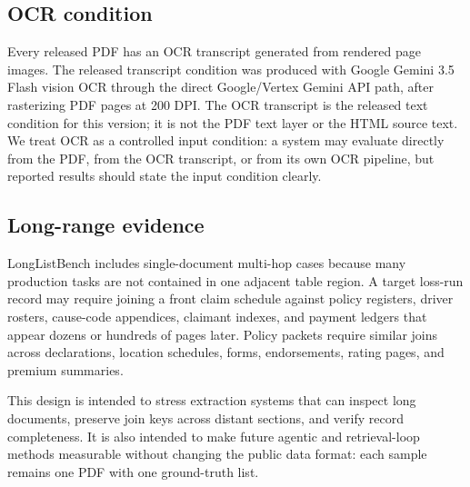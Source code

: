 \subsection{OCR condition}
\label{subsec:ocr-condition}
Every released PDF has an OCR transcript generated from rendered page images. The released transcript condition was produced with Google Gemini 3.5 Flash vision OCR through the direct Google/Vertex Gemini API path, after rasterizing PDF pages at 200 DPI. The OCR transcript is the released text condition for this version; it is not the PDF text layer or the HTML source text. We treat OCR as a controlled input condition: a system may evaluate directly from the PDF, from the OCR transcript, or from its own OCR pipeline, but reported results should state the input condition clearly.

\subsection{Long-range evidence}
LongListBench includes single-document multi-hop cases because many production tasks are not contained in one adjacent table region. A target loss-run record may require joining a front claim schedule against policy registers, driver rosters, cause-code appendices, claimant indexes, and payment ledgers that appear dozens or hundreds of pages later. Policy packets require similar joins across declarations, location schedules, forms, endorsements, rating pages, and premium summaries.

This design is intended to stress extraction systems that can inspect long documents, preserve join keys across distant sections, and verify record completeness. It is also intended to make future agentic and retrieval-loop methods measurable without changing the public data format: each sample remains one PDF with one ground-truth list.
